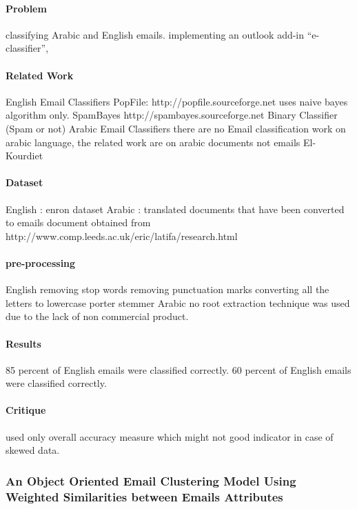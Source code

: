 \documentclass[12pt]{article}
\begin{document}
\paragraph{Problem}
classifying Arabic and English emails.
implementing an outlook add-in “e-classifier”,

\paragraph{Related Work}
English Email Classifiers
PopFile:
http://popfile.sourceforge.net
uses naive bayes algorithm only.
SpamBayes
http://spambayes.sourceforge.net
Binary Classifier (Spam or not)
Arabic Email Classifiers
there are no Email classification work on arabic language, the related work are on arabic documents not emails
El-Kourdiet

\paragraph{Dataset}
English : enron dataset
Arabic :
translated documents that have been converted to emails
document obtained from
http://www.comp.leeds.ac.uk/eric/latifa/research.html

\paragraph{pre-processing}
English
removing stop words
removing punctuation marks
converting all the letters to lowercase
porter stemmer
Arabic
no root extraction technique was used due to the lack of non commercial product.

\paragraph{Results}
85 percent of English emails were classified correctly.
60 percent of English emails were classified correctly.

\paragraph{Critique}
used only overall accuracy measure which might not good indicator in case of skewed data.




\subsubsection{An Object Oriented Email Clustering Model Using Weighted Similarities between Emails Attributes}
\end{document}
